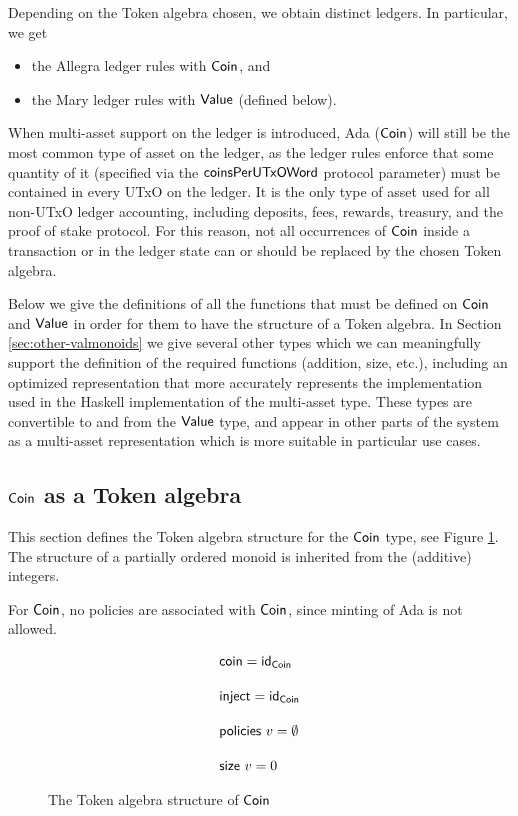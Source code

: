 Depending on the Token algebra chosen, we obtain distinct ledgers. In
particular, we get

\begin{itemize}
  \item the Allegra ledger rules with $\mathsf{Coin}$, and
  \item the Mary ledger rules with $\mathsf{Value}$ (defined below).
\end{itemize}

When multi-asset support on the ledger is introduced, Ada ($\mathsf{Coin}$) will still be
the most common type of asset on the ledger, as the ledger rules enforce that
some quantity of it (specified via
the $\mathsf{coinsPerUTxOWord}$ protocol parameter) must
be contained in every UTxO on the ledger.
It is the only
type of asset used for all non-UTxO ledger accounting, including deposits,
fees, rewards, treasury, and the proof of stake protocol. For this reason, not
all occurrences of $\mathsf{Coin}$ inside a transaction or in the ledger state can or
should be replaced by the chosen Token algebra.

Below we give the definitions of all the functions that must be defined on
$\mathsf{Coin}$ and $\mathsf{Value}$ in order for them to have the structure of a Token algebra.
In Section \ref{sec:other-valmonoids} we give several other types which we can meaningfully
support the definition of the required functions (addition, size, etc.), including
an optimized representation that more accurately represents the implementation
used in the Haskell implementation of the multi-asset type.
These types are convertible to and from the $\mathsf{Value}$ type, and appear in other
parts of the system as a multi-asset representation which is more suitable in particular
use cases.

\subsection{$\mathsf{Coin}$ as a Token algebra}

This section defines the Token algebra structure for the $\mathsf{Coin}$ type,
see Figure \ref{fig:coin}. The structure of a partially ordered monoid
is inherited from the (additive) integers.

For $\mathsf{Coin}$, no policies are associated with $\mathsf{Coin}$, since minting of Ada is not allowed.

\begin{figure}[htb]
  \begin{align*}
      & \fun{coin} = \fun{id}_{\Coin}
      \nextdef
      & \fun{inject} = \fun{id}_{\Coin}
      \nextdef
      & \fun{policies}~v = \emptyset
      \nextdef
      & \fun{size}~v = 0
  \end{align*}
  \caption{The Token algebra structure of $\mathsf{Coin}$}
  \label{fig:coin}
\end{figure}


